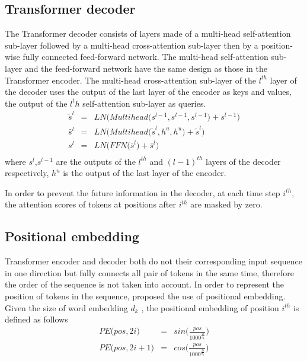 \subsection{Transformer decoder}
The Transformer decoder consists of layers made of a multi-head self-attention sub-layer followed by a multi-head cross-attention sub-layer then by a position-wise fully connected feed-forward network. The multi-head self-attention sub-layer and the feed-forward network have the same design as those in the Transformer encoder. The multi-head cross-attention sub-layer of the $l^{th}$ layer of the decoder uses the output of the last layer of the encoder as keys and values, the output of the $l^th$ self-attention sub-layer as queries.
\begin{equation}
\begin{array}{rcl}
\tilde{s}^l &=& LN\bigg( Multihead\big( s^{l-1},s^{l-1},s^{l-1} \big) + s^{l-1} \bigg) \\
\bar{s}^l &=& LN\bigg( Multihead\big( \tilde{s}^l, h^u, h^u \big) + \tilde{s}^l \bigg) \\
s^l &=& LN\bigg( FFN\big( \bar{s}^l \big) + \bar{s}^l \bigg) \\
\end{array}
\end{equation}
where $s^l$,$s^{l-1}$ are the outputs of the $l^{th}$ and $(l-1)^{th}$ layers of the decoder respectively, $h^u$ is the output of the last layer of the encoder.

In order to prevent the future information in the decoder, at each time step $i^{th}$, the attention scores of tokens at positions after $i^{th}$ are masked by zero.

\subsection{Positional embedding}
Transformer encoder and decoder both do not their corresponding input sequence in one direction but fully connects all pair of tokens in the same time, therefore the order of the sequence is not taken into account. In order to represent the position of tokens in the sequence, \cite{Vaswani17attention} proposed the use of positional embedding. Given the size of word embedding $d_k$ , the positional embedding of position $i^{th}$ is defined as follows
\begin{equation}
\begin{array}{rcl}
PE\big(pos,2i\big) &=& sin \big( \frac{pos}{1000^{\frac{2i}{d_k}}} \big)\\
PE\big(pos,2i+1\big) &=& cos \big( \frac{pos}{1000^{\frac{2i}{d_k}}} \big)\\
\end{array}
\end{equation}

